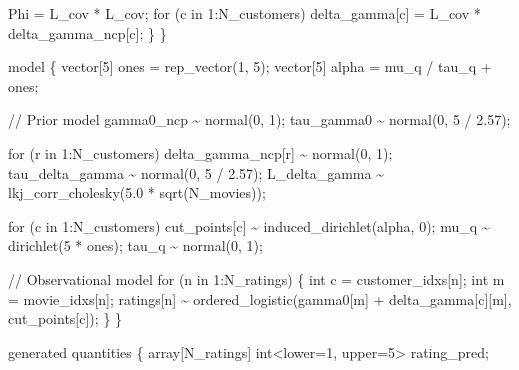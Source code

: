 \documentclass[
  letterpaper,
  DIV=11,
  numbers=noendperiod]{scrartcl}
\newenvironment{Shaded}{\begin{snugshade}}{\end{snugshade}}
\newcommand{\CommentTok}[1]{\textcolor[rgb]{0.37,0.37,0.37}{#1}}
\newcommand{\ControlFlowTok}[1]{\textcolor[rgb]{0.00,0.23,0.31}{#1}}
\newcommand{\DataTypeTok}[1]{\textcolor[rgb]{0.68,0.00,0.00}{#1}}
\newcommand{\DecValTok}[1]{\textcolor[rgb]{0.68,0.00,0.00}{#1}}
\newcommand{\FloatTok}[1]{\textcolor[rgb]{0.68,0.00,0.00}{#1}}
\newcommand{\KeywordTok}[1]{\textcolor[rgb]{0.00,0.23,0.31}{#1}}
\newcommand{\NormalTok}[1]{\textcolor[rgb]{0.00,0.23,0.31}{#1}}
\begin{document}
\begin{codelisting}
\begin{Shaded}
\begin{Highlighting}[]
\NormalTok{    Phi = L\_cov * L\_cov\textquotesingle{};}
    \ControlFlowTok{for}\NormalTok{ (c }\ControlFlowTok{in} \DecValTok{1}\NormalTok{:N\_customers)}
\NormalTok{      delta\_gamma[c] = L\_cov * delta\_gamma\_ncp[c];}
\NormalTok{  \}}
\NormalTok{\}}

\KeywordTok{model}\NormalTok{ \{}
  \DataTypeTok{vector}\NormalTok{[}\DecValTok{5}\NormalTok{] ones = rep\_vector(}\DecValTok{1}\NormalTok{, }\DecValTok{5}\NormalTok{);}
  \DataTypeTok{vector}\NormalTok{[}\DecValTok{5}\NormalTok{] alpha = mu\_q / tau\_q + ones;}

  \CommentTok{// Prior model}
\NormalTok{  gamma0\_ncp \textasciitilde{} normal(}\DecValTok{0}\NormalTok{, }\DecValTok{1}\NormalTok{);}
\NormalTok{  tau\_gamma0 \textasciitilde{} normal(}\DecValTok{0}\NormalTok{, }\DecValTok{5}\NormalTok{ / }\FloatTok{2.57}\NormalTok{);}

  \ControlFlowTok{for}\NormalTok{ (r }\ControlFlowTok{in} \DecValTok{1}\NormalTok{:N\_customers)}
\NormalTok{    delta\_gamma\_ncp[r] \textasciitilde{} normal(}\DecValTok{0}\NormalTok{, }\DecValTok{1}\NormalTok{);}
\NormalTok{  tau\_delta\_gamma \textasciitilde{} normal(}\DecValTok{0}\NormalTok{, }\DecValTok{5}\NormalTok{ / }\FloatTok{2.57}\NormalTok{);}
\NormalTok{  L\_delta\_gamma \textasciitilde{} lkj\_corr\_cholesky(}\FloatTok{5.0}\NormalTok{ * sqrt(N\_movies));}

  \ControlFlowTok{for}\NormalTok{ (c }\ControlFlowTok{in} \DecValTok{1}\NormalTok{:N\_customers)}
\NormalTok{    cut\_points[c] \textasciitilde{} induced\_dirichlet(alpha, }\DecValTok{0}\NormalTok{);}
\NormalTok{  mu\_q \textasciitilde{} dirichlet(}\DecValTok{5}\NormalTok{ * ones);}
\NormalTok{  tau\_q \textasciitilde{} normal(}\DecValTok{0}\NormalTok{, }\DecValTok{1}\NormalTok{);}

  \CommentTok{// Observational model}
  \ControlFlowTok{for}\NormalTok{ (n }\ControlFlowTok{in} \DecValTok{1}\NormalTok{:N\_ratings) \{}
    \DataTypeTok{int}\NormalTok{ c = customer\_idxs[n];}
    \DataTypeTok{int}\NormalTok{ m = movie\_idxs[n];}
\NormalTok{    ratings[n] \textasciitilde{} ordered\_logistic(gamma0[m] + delta\_gamma[c][m],}
\NormalTok{                                  cut\_points[c]);}
\NormalTok{  \}}
\NormalTok{\}}

\KeywordTok{generated quantities}\NormalTok{ \{}
  \DataTypeTok{array}\NormalTok{[N\_ratings] }\DataTypeTok{int}\NormalTok{\textless{}}\KeywordTok{lower}\NormalTok{=}\DecValTok{1}\NormalTok{, }\KeywordTok{upper}\NormalTok{=}\DecValTok{5}\NormalTok{\textgreater{} rating\_pred;}


\end{Highlighting}
\end{Shaded}
\end{codelisting}
\end{document}
